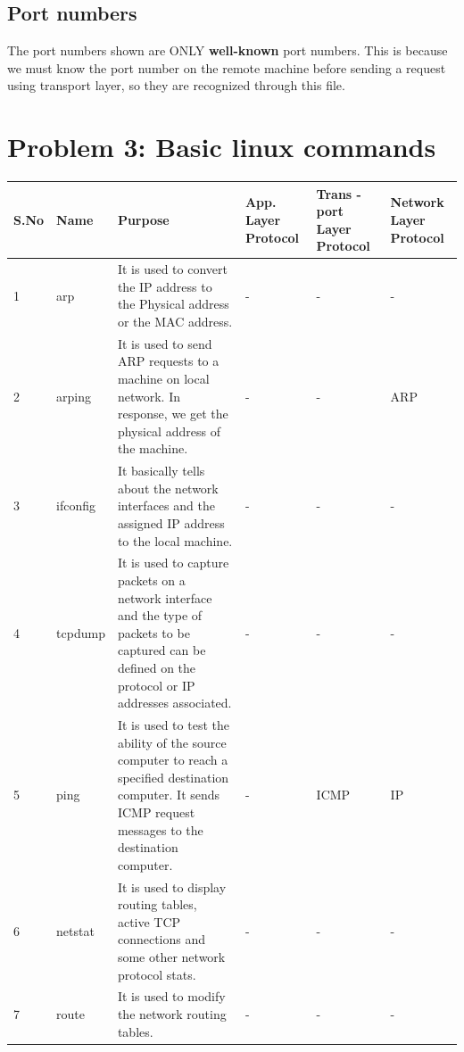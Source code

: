 \documentclass[]{report}
\begin{document}
\subsection{Port numbers}
The port numbers shown are ONLY \textbf{well-known} port numbers. This is because we must know the port number on the remote machine before sending a request using transport layer, so they are recognized through this file. 

\section{Problem 3: Basic linux commands}
\large
\begin{center}
	\begin{tabular}{ |p{1cm}|p{1.4cm}||p{5cm}|p{1.0cm}|p{1.0cm}|p{1.2cm}||  }
		\hline
		S.No & Name	&	Purpose	&	App. Layer Protocol	&	Trans - port Layer Protocol	&	Network Layer Protocol	\\
		\hline
		1 & arp         & It is used to convert the IP address to the Physical address or the MAC address. & - & - & -						\\
		2 & arping    & It is used to send ARP requests to a machine on local network. In response, we get the physical address of the machine. & - & - & ARP				\\
		3 & ifconfig  & It basically tells about the network interfaces and the assigned IP address to the local machine. & - & - & -						\\
		4 & tcpdump& It is used to capture packets on a network interface and the type of packets to be captured can be defined on the protocol or IP addresses associated. & - & - & -						\\
		5 & ping       & It is used to test the ability of the source computer to reach a specified destination computer. It sends ICMP request messages to the destination computer. & - & ICMP & IP						\\
		6 & netstat   & It is used to display routing tables, active TCP connections and some other network protocol stats. & - & - & -						\\
		7 & route      & It is used to modify the network routing tables. & - & - & -						\\
		\hline
	\end{tabular} 
\end{center}

\end{document}
